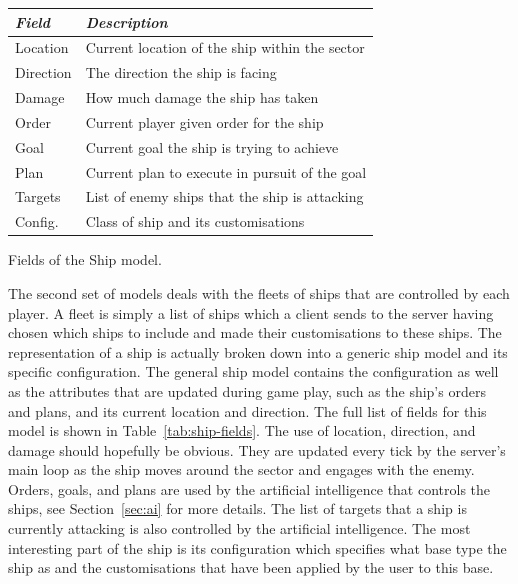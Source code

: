 \begin{margintable}
    \begin{tabular}{p{4em} p{11em}}
    \toprule
    \emph{Field} & \emph{Description} \\
    \midrule
    Location & Current location of the ship within the sector \\
    Direction & The direction the ship is facing \\
    Damage & How much damage the ship has taken \\
    Order & Current player given order for the ship \\
    Goal & Current goal the ship is trying to achieve \\
    Plan & Current plan to execute in pursuit of the goal \\
    Targets & List of enemy ships that the ship is attacking \\
    Config. & Class of ship and its customisations \\
    \bottomrule
    \end{tabular}
    \vspace{1em}
    \caption[Fields of the Ship model]{Fields of the Ship model.}
    \label{tab:ship-fields}
\end{margintable}

The second set of models deals with the fleets of ships that are controlled by each player. A fleet is simply a list of ships which a client sends to the server having chosen which ships to include and made their customisations to these ships. The representation of a ship is actually broken down into a generic ship model and its specific configuration. The general ship model contains the configuration as well as the attributes that are updated during game play, such as the ship's orders and plans, and its current location and direction. The full list of fields for this model is shown in Table~\ref{tab:ship-fields}. The use of location, direction, and damage should hopefully be obvious. They are updated every tick by the server's main loop as the ship moves around the sector and engages with the enemy. Orders, goals, and plans are used by the artificial intelligence that controls the ships, see Section~\ref{sec:ai} for more details. The list of targets that a ship is currently attacking is also controlled by the artificial intelligence. The most interesting part of the ship is its configuration which specifies what base type the ship as and the customisations that have been applied by the user to this base.

